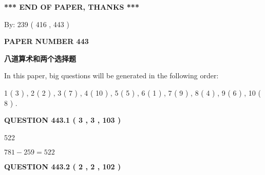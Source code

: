 \documentclass{ctexart}
\begin{document}
 
   
   
 \vspace{0.2in}
 
   
   
   
   
\vspace{1.0in} 
{\textbf{\large{ *** END OF PAPER, THANKS *** }}} 
   
   
\hspace{1.0in} By: 
 239 ( 416 ,  443 )
   
   
   
   
\newpage 
\setcounter{page}{ 
   443001 } 
   
   
   
   
 {\textbf{ \Large{ PAPER NUMBER  443  }}}
   
   
\vspace{0.2in}
   
   
   
   
   
   
 \vspace{0.2in}
{\LARGE {\textbf{ 八道算术和两个选择题}}}
   
   
   
\vspace{0.2in}
   
In this paper, big questions will be generated in the following order: 
   
   
   1 ( 3 )
 ,
   2 ( 2 )
 ,
   3 ( 7 )
 ,
   4 ( 10 )
 ,
   5 ( 5 )
 ,
   6 ( 1 )
 ,
   7 ( 9 )
 ,
   8 ( 4 )
 ,
   9 ( 6 )
 ,
   10 ( 8 )
 .
  
\vspace{0.2in}
  
{\textbf{\Large{QUESTION
443.1 
 ( 3 , 3 , 103 )
}}}
  
  
 
 
\noindent{}

522
 
 
 
 
\noindent{}

$ %
781 -  %
259=   %
522$
 
 
  
\vspace{0.2in}
  
{\textbf{\Large{QUESTION
443.2 
 ( 2 , 2 , 102 )
}}}
  
\end{document}
